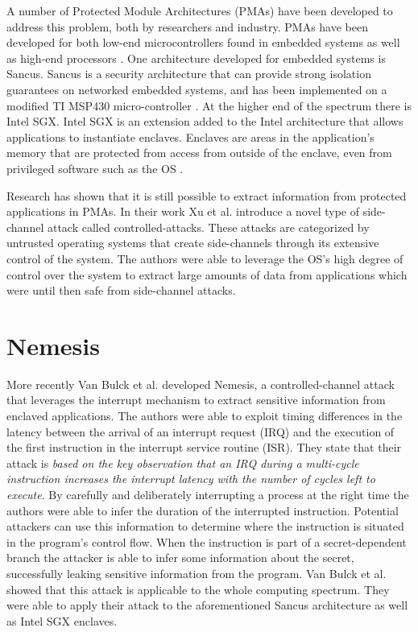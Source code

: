 A number of Protected Module Architectures (PMAs) have been developed to address this problem, both by researchers and industry. 
PMAs have been developed for both low-end microcontrollers found in embedded systems \cite{trustlite, smart} as well as high-end processors \cite{isox}.
One architecture developed for embedded systems is Sancus. Sancus is a security architecture that can provide strong isolation guarantees on networked embedded systems, 
and has been implemented on a modified TI MSP430 micro-controller \cite{sancus}. 
At the higher end of the spectrum there is Intel SGX. 
Intel SGX is an extension  added to the Intel architecture that allows applications to instantiate enclaves. 
Enclaves are areas in the application's memory that are protected from access from outside of the enclave, even from 
privileged software such as the OS \cite{SGX}. 

Research has shown that it is still possible to extract information from protected applications in PMAs. In their work Xu et al. \cite{xu} introduce a novel type of side-channel attack 
called controlled-attacks. These attacks are categorized by untrusted operating systems that create side-channels through its extensive control of the system.
The authors were able to leverage the OS's high degree of control over the system to extract large amounts of data from applications which were until 
then safe from side-channel attacks. 

\section{Nemesis}
More recently Van Bulck et al. \cite{Nemesis} developed Nemesis, a controlled-channel attack that leverages the interrupt mechanism to extract sensitive information from 
enclaved applications. The authors were able to exploit timing differences in the latency between the arrival of an interrupt request (IRQ) and the execution of the first instruction in the 
interrupt service routine (ISR). They state that their attack is \textit{based on the key observation that an IRQ during a multi-cycle instruction increases the interrupt 
latency with the number of cycles left to execute}. By carefully and deliberately interrupting a process at the right time the authors were able to infer the duration of the interrupted instruction. 
Potential attackers can use this information to determine where the instruction is situated in the program's control flow. When the instruction is part of a secret-dependent branch the 
attacker is able to infer some information about the secret, successfully leaking sensitive information from the program. Van Bulck et al. \cite{Nemesis} showed that this attack is applicable to 
the whole computing spectrum. They were able to apply their attack to the aforementioned Sancus architecture as well as Intel SGX enclaves.  

